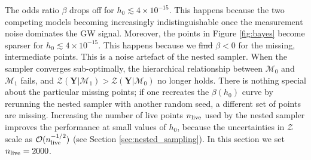 \documentclass[fleqn,usenatbib,useAMS]{mnras}
\providecommand{\DIFadd}[1]{{\protect\color{blue}\uwave{#1}}} %
\providecommand{\DIFdel}[1]{{\protect\color{red}\sout{#1}}}                      %
\providecommand{\DIFaddbegin}{} %
\providecommand{\DIFaddend}{} %
\providecommand{\DIFdelbegin}{} %
\providecommand{\DIFdelend}{} %
\newcommand{\DIFscaledelfig}{0.5}
\newlength{\DIFdelgraphicswidth} %
\newlength{\DIFdelgraphicsheight} %
\newcommand{\DIFaddincludegraphics}[2][]{{\color{blue}\fbox{\DIFOincludegraphics[#1]{#2}}}} %
\newcommand{\DIFdelincludegraphics}[2][]{%
\sbox{\DIFdelgraphicsbox}{\DIFOincludegraphics[#1]{#2}}%
\settoboxwidth{\DIFdelgraphicswidth}{\DIFdelgraphicsbox} %
\settoboxtotalheight{\DIFdelgraphicsheight}{\DIFdelgraphicsbox} %
\scalebox{\DIFscaledelfig}{%
\parbox[b]{\DIFdelgraphicswidth}{\usebox{\DIFdelgraphicsbox}\\[-\baselineskip] \rule{\DIFdelgraphicswidth}{0em}}\llap{\resizebox{\DIFdelgraphicswidth}{\DIFdelgraphicsheight}{%
\setlength{\unitlength}{\DIFdelgraphicswidth}%
\begin{picture}(1,1)%
\thicklines\linethickness{2pt} %
{\color[rgb]{1,0,0}\put(0,0){\framebox(1,1){}}}%
{\color[rgb]{1,0,0}\put(0,0){\line( 1,1){1}}}%
{\color[rgb]{1,0,0}\put(0,1){\line(1,-1){1}}}%
\end{picture}%
}\hspace*{3pt}}} %
} %
\DeclareRobustCommand{\DIFaddbegin}{\DIFOaddbegin \let\includegraphics\DIFaddincludegraphics} %
\DeclareRobustCommand{\DIFaddend}{\DIFOaddend \let\includegraphics\DIFOincludegraphics} %
\DeclareRobustCommand{\DIFdelbegin}{\DIFOdelbegin \let\includegraphics\DIFdelincludegraphics} %
\DeclareRobustCommand{\DIFdelend}{\DIFOaddend \let\includegraphics\DIFOincludegraphics} %
\begin{document}
The odds ratio $\beta$ drops off for $h_0 \lesssim 4 \times10^{-15}$. This happens because the two competing models becoming increasingly indistinguishable once the measurement noise dominates the GW signal. Moreover, the points in Figure \ref{fig:bayes} become sparser for $h_0 \lesssim 4 \times 10^{-15}$. This happens because we \DIFdelbegin \DIFdel{find }\DIFdelend \DIFaddbegin \DIFadd{obtain }\DIFaddend $\beta <0$ for the missing, intermediate points. This is a noise artefact of the nested sampler. When the sampler converges sub-optimally, the hierarchical relationship between $\mathcal{M}_0$ and  $\mathcal{M}_1$ fails, and $\mathcal{Z}(\boldsymbol{Y} | \mathcal{M}_1) > \mathcal{Z}(\boldsymbol{Y} | \mathcal{M}_0)$ no longer holds. There is nothing special about the particular missing points; if one recreates the $\beta(h_0)$ curve by rerunning the nested sampler with another random seed, a different set of points are missing. Increasing the number of live points $n_{\rm live}$ used by the nested sampler improves the performance at small values of $h_0$, because the uncertainties in $\mathcal{Z}$ scale as $\mathcal{O}(n_{\rm live}^{-1/2})$ (see Section \ref{sec:nested_sampling}). In this section we set $n_{\rm live} =2000$. 
\end{document}
